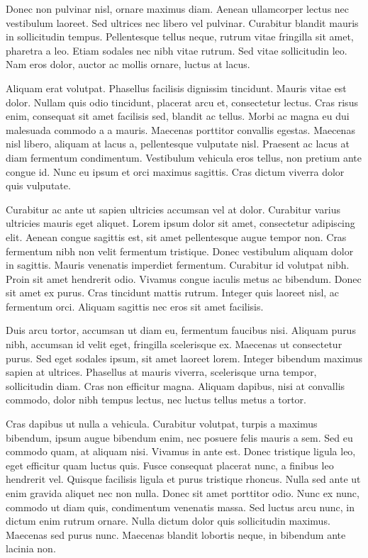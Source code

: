 \documentclass[a4paper, 12pt]{article}
\begin{document}
	{\tiny Donec non pulvinar nisl}, {\Large ornare maximus diam}. Aenean ullamcorper lectus nec vestibulum laoreet. Sed ultrices nec libero vel pulvinar. Curabitur blandit mauris in sollicitudin tempus. Pellentesque tellus neque, rutrum vitae fringilla sit amet, pharetra a leo. Etiam sodales nec nibh vitae rutrum. Sed vitae sollicitudin leo. Nam eros dolor, auctor ac mollis ornare, luctus at lacus.
	
	Aliquam erat volutpat. Phasellus facilisis dignissim tincidunt. Mauris vitae est dolor. Nullam quis odio tincidunt, placerat arcu et, consectetur lectus. Cras risus enim, consequat sit amet facilisis sed, blandit ac tellus. Morbi ac magna eu dui malesuada commodo a a mauris. Maecenas porttitor convallis egestas. Maecenas nisl libero, aliquam at lacus a, pellentesque vulputate nisl. Praesent ac lacus at diam fermentum condimentum. Vestibulum vehicula eros tellus, non pretium ante congue id. Nunc eu ipsum et orci maximus sagittis. Cras dictum viverra dolor quis vulputate.
	
	Curabitur ac ante ut sapien ultricies accumsan vel at dolor. Curabitur varius ultricies mauris eget aliquet. Lorem ipsum dolor sit amet, consectetur adipiscing elit. Aenean congue sagittis est, sit amet pellentesque augue tempor non. Cras fermentum nibh non velit fermentum tristique. Donec vestibulum aliquam dolor in sagittis. Mauris venenatis imperdiet fermentum. Curabitur id volutpat nibh. Proin sit amet hendrerit odio. Vivamus congue iaculis metus ac bibendum. Donec sit amet ex purus. Cras tincidunt mattis rutrum. Integer quis laoreet nisl, ac fermentum orci. Aliquam sagittis nec eros sit amet facilisis.
	
	Duis arcu tortor, accumsan ut diam eu, fermentum faucibus nisi. Aliquam purus nibh, accumsan id velit eget, fringilla scelerisque ex. Maecenas ut consectetur purus. Sed eget sodales ipsum, sit amet laoreet lorem. Integer bibendum maximus sapien at ultrices. Phasellus at mauris viverra, scelerisque urna tempor, sollicitudin diam. Cras non efficitur magna. Aliquam dapibus, nisi at convallis commodo, dolor nibh tempus lectus, nec luctus tellus metus a tortor.
	
	Cras dapibus ut nulla a vehicula. Curabitur volutpat, turpis a maximus bibendum, ipsum augue bibendum enim, nec posuere felis mauris a sem. Sed eu commodo quam, at aliquam nisi. Vivamus in ante est. Donec tristique ligula leo, eget efficitur quam luctus quis. Fusce consequat placerat nunc, a finibus leo hendrerit vel. Quisque facilisis ligula et purus tristique rhoncus. Nulla sed ante ut enim gravida aliquet nec non nulla. Donec sit amet porttitor odio. Nunc ex nunc, commodo ut diam quis, condimentum venenatis massa. Sed luctus arcu nunc, in dictum enim rutrum ornare. Nulla dictum dolor quis sollicitudin maximus. Maecenas sed purus nunc. Maecenas blandit lobortis neque, in bibendum ante lacinia non.
	
\end{document}
